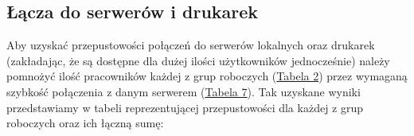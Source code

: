 \documentclass[a4paper,12pt]{extarticle}  %
\begin{document}
\subsection{Łącza do serwerów i drukarek}
Aby uzyskać przepustowości połączeń do serwerów lokalnych oraz drukarek
(zakładając, że są dostępne dla dużej ilości użytkowników jednocześnie)
należy pomnożyć ilość pracowników każdej z grup roboczych (\href{tab:groups_sum}{Tabela 2})
przez wymaganą szybkość połączenia z danym serwerem (\underline{\href{tab:usage}{Tabela 7}}).
Tak uzyskane wyniki przedstawiamy w tabeli reprezentującej przepustowości dla każdej z grup
roboczych oraz ich łączną sumę:
\begin{table}[H]
	\centering
	\caption{Szacowane przepustowości połączeń poboru danych z serwerów i drukarek}
	\label{tab:server_download}%
\end{table}%
\end{document}
